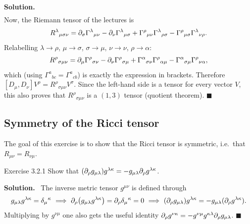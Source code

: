 \documentclass[11pt,a4paper]{article}
\numberwithin{equation}{subsection}
\newenvironment{solution}{\par\noindent\textbf{\textcolor{excol!70!black}{Solution.}}\ }{\hfill$\blacksquare$\par\medskip}
\newcommand{\added}[1]{{\color{teal!60!black}#1}}
\begin{document}
\begin{solution}
\begin{gather*}
\end{gather*}
Now, the Riemann tensor of the lectures is
\[
  R^\lambda{}_{\mu\sigma\nu}=\partial_\sigma\Gamma^\lambda{}_{\mu\nu}-\partial_\nu\Gamma^\lambda{}_{\mu\sigma}+\Gamma^\rho{}_{\mu\nu}\Gamma^\lambda{}_{\rho\sigma}-\Gamma^\rho{}_{\mu\sigma}\Gamma^\lambda{}_{\nu\rho}.
\]
Relabelling $\lambda\to\rho$, $\mu\to\sigma$, $\sigma\to\mu$, $\nu\to\nu$, $\rho\to\alpha$:
\[
  R^\rho{}_{\sigma\mu\nu}=\partial_\mu\Gamma^\rho{}_{\sigma\nu}-\partial_\nu\Gamma^\rho{}_{\sigma\mu}+\Gamma^\alpha{}_{\sigma\nu}\Gamma^\rho{}_{\alpha\mu}-\Gamma^\alpha{}_{\sigma\mu}\Gamma^\rho{}_{\nu\alpha},
\]
which (using $\Gamma^a{}_{bc}=\Gamma^a{}_{cb}$) is exactly the expression in brackets. Therefore $[D_\mu,D_\nu]V^\rho=R^\rho{}_{\sigma\mu\nu}V^\sigma$. Since the left-hand side is a tensor for every vector $V$, this also proves that $R^\rho{}_{\sigma\mu\nu}$ is a $(1,3)$ tensor (quotient theorem).
\end{solution}

\subsection{Symmetry of the Ricci tensor}
The goal of this exercise is to show that the Ricci tensor is symmetric, i.e.\ that $R_{\mu\nu}=R_{\nu\mu}$.

\begin{problem}{Exercise 3.2.1}
Show that $(\partial_\rho g_{\mu\lambda})g^{\lambda\kappa}=-g_{\mu\lambda}\partial_\rho g^{\lambda\kappa}$.
\end{problem}
\begin{solution}
The inverse metric tensor $g^{\mu\nu}$ is defined through
\[
  g_{\mu\lambda}g^{\lambda\kappa}=\delta_\mu{}^\kappa\ \Longrightarrow\ \pd_\rho\big(g_{\mu\lambda}g^{\lambda\kappa}\big)=\pd_\rho\delta_\mu{}^\kappa=0\ \Longrightarrow\ (\pd_\rho g_{\mu\lambda})g^{\lambda\kappa}=-g_{\mu\lambda}(\pd_\rho g^{\lambda\kappa}).
\]
\added{Multiplying by $g^{\nu\mu}$ one also gets the useful identity $\partial_\rho g^{\nu\kappa}=-g^{\nu\mu}g^{\kappa\lambda}\partial_\rho g_{\mu\lambda}$.}
\end{solution}
\end{document}
